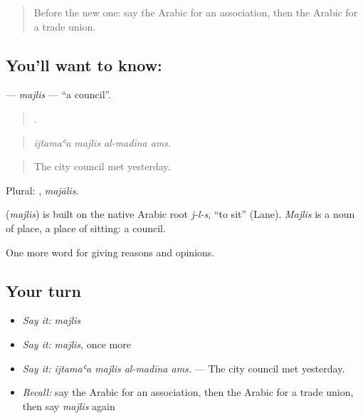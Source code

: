 \begin{quote}
Before the new one: say the Arabic for an association, then the Arabic for a trade union.
\end{quote}

\subsection*{You'll want to know: }
\textbf{} — \emph{majlis} — \textquotedblleft{}a council\textquotedblright{}.

\begin{quote}
   .
\end{quote}

\begin{quote}
\emph{ijtamaʿa majlis al-madīna ams.}
\end{quote}

\begin{quote}
The city council met yesterday.
\end{quote}

Plural: , \emph{majālis}.

\begin{cousinweb}
\textbf{} (\emph{majlis}) is built on the native Arabic root \emph{j-l-s}, \textquotedblleft{}to sit\textquotedblright{} (Lane). \emph{Majlis} is a noun of place, a place of sitting: a council.
\end{cousinweb}

\begin{grammarlens}[title={What you've built}]
One more word for giving reasons and opinions.
\end{grammarlens}

\subsection*{Your turn}
\begin{itemize}
\raggedright
  \item \emph{Say it:} \emph{majlis}
  \item \emph{Say it:} \emph{majlis}, once more
  \item \emph{Say it:} \emph{ijtamaʿa majlis al-madīna ams.} — The city council met yesterday.
  \item \emph{Recall:} say the Arabic for an association, then the Arabic for a trade union, then say \emph{majlis} again
\end{itemize}

